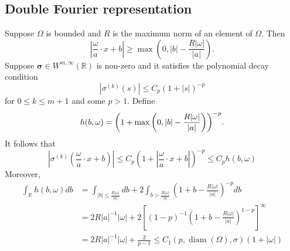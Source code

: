 \subsection{Double Fourier representation}
Suppose $\Omega$ is bounded and $R$ is the maximum norm of an element of $\Omega$. Then
\begin{equation}
\left|\frac{\omega}{a} \cdot x+b\right| \geq \max \left(0,|b|-\frac{R|\omega|}{|a|}\right).
\end{equation}
Suppose $\boldsymbol{\sigma} \in W^{m, \infty}(\mathbb{R})$ is non-zero and it satisfies the polynomial decay condition
\begin{equation}\label{eq:assdecay}
\left|\sigma^{(k)}(s)\right| \leq C_{p}(1+|s|)^{-p}
\end{equation}
for $0\le k\le m+1$ and some $p> 1$. 
Define
\begin{equation}
h(b,\omega)=\bigg (1+ \max \bigg(0, |b|-{R|\omega|\over |a|}\bigg )\bigg )^{-p}.
\end{equation}
It follows that
\begin{equation}\label{eq:decaypro}
\left|\sigma^{(k)}\left(\frac{\omega}{a} \cdot x+b\right)\right| \leq C_{p}\left(1+\left|\frac{\omega}{a} \cdot x+b\right|\right)^{-p} \leq C_{p}h(b,\omega)
\end{equation}
Moreover,
\begin{equation}
\begin{aligned}
\int_{\mathbb{R}} h(b, \omega) d b &=\int_{|b| \leq \frac{R|\omega|}{|a|}} d b+2 \int_{b>\frac{R|\omega|}{|a|}}\left(1+b-\frac{R|\omega|}{|a|}\right)^{-p} d b \\
&=2 R|a|^{-1}|\omega|+2\left[(1-p)^{-1}\left(1+b-\frac{R|\omega|}{|a|}\right)^{1-p}\right]^{\infty} \\
&=2 R|a|^{-1}|\omega|+\frac{2}{p-1} \leq C_{1}(p, \operatorname{diam}(\Omega), \sigma)(1+|\omega|)
\end{aligned}
\end{equation} 

